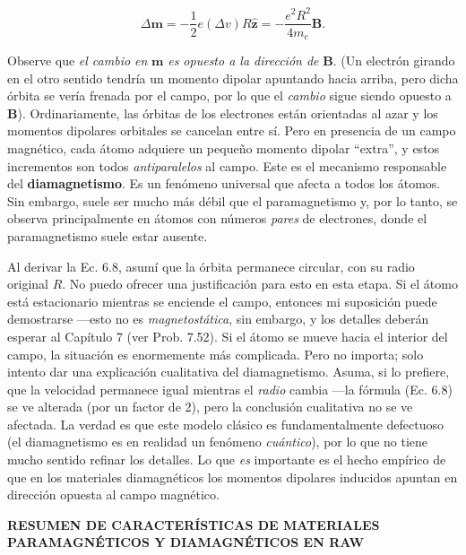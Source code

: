 \documentclass[12pt,a4paper]{report}
\newcommand{\esp}{\vspace{0.5cm}}
\begin{document}
	\begin{equation}
		\Delta \mathbf{m} = -\frac{1}{2} e(\Delta v)R \mathbf{\hat{z}} = -\frac{e^2 R^2}{4m_e} \mathbf{B}. \tag{6.8}
	\end{equation}
	
	\esp
	
	Observe que \textit{el cambio en} $\mathbf{m}$ \textit{es opuesto a la dirección de} $\mathbf{B}$. (Un electrón girando en el otro sentido tendría un momento dipolar apuntando hacia arriba, pero dicha órbita se vería frenada por el campo, por lo que el \textit{cambio} sigue siendo opuesto a $\mathbf{B}$). Ordinariamente, las órbitas de los electrones están orientadas al azar y los momentos dipolares orbitales se cancelan entre sí. Pero en presencia de un campo magnético, cada átomo adquiere un pequeño momento dipolar ``extra'', y estos incrementos son todos \textit{antiparalelos} al campo. Este es el mecanismo responsable del \textbf{diamagnetismo}. Es un fenómeno universal que afecta a todos los átomos. Sin embargo, suele ser mucho más débil que el paramagnetismo y, por lo tanto, se observa principalmente en átomos con números \textit{pares} de electrones, donde el paramagnetismo suele estar ausente.
	
	\esp
	
	Al derivar la Ec. 6.8, asumí que la órbita permanece circular, con su radio original $R$. No puedo ofrecer una justificación para esto en esta etapa. Si el átomo está estacionario mientras se enciende el campo, entonces mi suposición puede demostrarse —esto no es \textit{magnetostática}, sin embargo, y los detalles deberán esperar al Capítulo 7 (ver Prob. 7.52). Si el átomo se mueve hacia el interior del campo, la situación es enormemente más complicada. Pero no importa; solo intento dar una explicación cualitativa del diamagnetismo. Asuma, si lo prefiere, que la velocidad permanece igual mientras el \textit{radio} cambia —la fórmula (Ec. 6.8) se ve alterada (por un factor de 2), pero la conclusión cualitativa no se ve afectada. La verdad es que este modelo clásico es fundamentalmente defectuoso (el diamagnetismo es en realidad un fenómeno \textit{cuántico}), por lo que no tiene mucho sentido refinar los detalles. Lo que \textit{es} importante es el hecho empírico de que en los materiales diamagnéticos los momentos dipolares inducidos apuntan en dirección opuesta al campo magnético.
	
	\esp
	
	\noindent \textbf{RESUMEN DE CARACTERÍSTICAS DE MATERIALES PARAMAGNÉTICOS Y DIAMAGNÉTICOS EN RAW}
	
\end{document}
